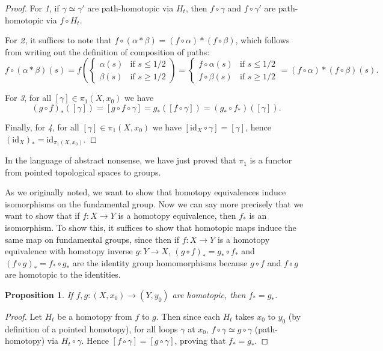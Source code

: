 \documentclass{article}
\newtheorem{prop}[thm]{Proposition}
\theoremstyle{definition}
\theoremstyle{remark}
\numberwithin{figure}{section}
\begin{document}
\begin{proof}
	For \emph{1}, if $\gamma \simeq \gamma'$ are path-homotopic via $H_t$, then $f \circ \gamma$ and $f \circ \gamma'$ are path-homotopic via $f \circ H_t$.
	
	For $\emph{2}$, it suffices to note that $f \circ (\alpha * \beta) = (f \circ \alpha) * (f \circ \beta)$, which follows from writing out the definition of composition of paths:
	\[
	f \circ (\alpha * \beta)(s) = f\left(\begin{cases}
		\alpha(s) & \text{if } s \leq 1/2\\
		\beta(s) & \text{if } s \geq 1/2
	\end{cases}\right) = \begin{cases}
		f \circ \alpha(s) & \text{if } s \leq 1/2\\
		f \circ \beta(s) & \text{if } s \geq 1/2
	\end{cases} = (f \circ \alpha) * (f \circ \beta)(s).
	\]
	
	For \emph{3}, for all $[\gamma] \in \pi_1(X, x_0)$ we have
	\[
	(g \circ f)_*([\gamma]) = [g \circ f \circ \gamma] = g_*([f \circ \gamma]) = (g_* \circ f_*)([\gamma]).
	\]
	
	Finally, for \emph{4}, for all $[\gamma] \in \pi_1(X, x_0)$ we have $[\mathrm{id}_X \circ \gamma] = [\gamma]$, hence $(\mathrm{id}_X)_* = \mathrm{id}_{\pi_1(X, x_0)}$.
\end{proof}

In the language of abstract nonsense, we have just proved that $\pi_1$ is a functor from pointed topological spaces to groups.

As we originally noted, we want to show that homotopy equivalences induce isomorphisms on the fundamental group. Now we can say more precisely that we want to show that if $f : X \to Y$ is a homotopy equivalence, then $f_*$ is an isomorphism. To show this, it suffices to show that homotopic maps induce the same map on fundamental groups, since then if $f : X \to Y$ is a homotopy equivalence with homotopy inverse $g : Y \to X$, $(g \circ f)_* = g_* \circ f_*$ and $(f \circ g)_* = f_* \circ g_*$ are the identity group homomorphisms because $g \circ f$ and $f \circ g$ are homotopic to the identities.

\begin{prop}
	If $f, g : (X, x_0) \to (Y, y_0)$ are homotopic, then $f_* = g_*$.
\end{prop}

\begin{proof}
	Let $H_t$ be a homotopy from $f$ to $g$. Then since each $H_t$ takes $x_0$ to $y_0$ (by definition of a pointed homotopy), for all loops $\gamma$ at $x_0$, $f \circ \gamma \simeq g \circ \gamma$ (path-homotopy) via $H_t \circ \gamma$. Hence $[f \circ \gamma] = [g \circ \gamma]$, proving that $f_* = g_*$.
\end{proof}
\end{document}
